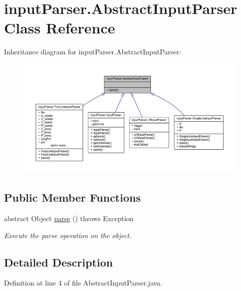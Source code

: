 \hypertarget{classinput_parser_1_1_abstract_input_parser}{\section{input\-Parser.\-Abstract\-Input\-Parser Class Reference}
\label{classinput_parser_1_1_abstract_input_parser}
}


Inheritance diagram for input\-Parser.\-Abstract\-Input\-Parser\-:\nopagebreak
\begin{figure}[H]
\begin{center}
\leavevmode
\includegraphics[width=350pt]{classinput_parser_1_1_abstract_input_parser__inherit__graph}
\end{center}
\end{figure}
\subsection*{Public Member Functions}
\begin{DoxyCompactItemize}
\item 
abstract Object \hyperlink{classinput_parser_1_1_abstract_input_parser_a548b0f6fa44b7954b79bdd964336bafe}{parse} ()  throws Exception
\begin{DoxyCompactList}\small\item\em Execute the parse operation on the object. \end{DoxyCompactList}\end{DoxyCompactItemize}


\subsection{Detailed Description}


Definition at line 4 of file Abstract\-Input\-Parser.\-java.



